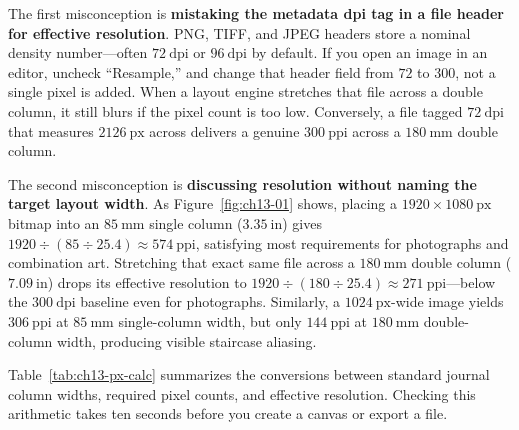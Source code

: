 The first misconception is \textbf{mistaking the metadata dpi tag in a file header for effective resolution}. PNG, TIFF, and JPEG headers store a nominal density number---often $72\ \text{dpi}$ or $96\ \text{dpi}$ by default. If you open an image in an editor, uncheck ``Resample,'' and change that header field from $72$ to $300$, not a single pixel is added. When a layout engine stretches that file across a double column, it still blurs if the pixel count is too low. Conversely, a file tagged $72\ \text{dpi}$ that measures $2126\ \text{px}$ across delivers a genuine $300\ \text{ppi}$ across a $180\ \text{mm}$ double column.

The second misconception is \textbf{discussing resolution without naming the target layout width}. As Figure~\ref{fig:ch13-01} shows, placing a $1920 \times 1080\ \text{px}$ bitmap into an $85\ \text{mm}$ single column ($3.35\ \text{in}$) gives $1920 \div (85 \div 25.4) \approx 574\ \text{ppi}$, satisfying most requirements for photographs and combination art. Stretching that exact same file across a $180\ \text{mm}$ double column ($7.09\ \text{in}$) drops its effective resolution to $1920 \div (180 \div 25.4) \approx 271\ \text{ppi}$---below the $300\ \text{dpi}$ baseline even for photographs. Similarly, a $1024\ \text{px}$-wide image yields $306\ \text{ppi}$ at $85\ \text{mm}$ single-column width, but only $144\ \text{ppi}$ at $180\ \text{mm}$ double-column width, producing visible staircase aliasing.

Table~\ref{tab:ch13-px-calc} summarizes the conversions between standard journal column widths, required pixel counts, and effective resolution. Checking this arithmetic takes ten seconds before you create a canvas or export a file.


